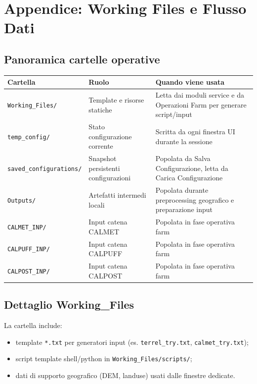 \chapter{Appendice: Working Files e Flusso Dati}

\section{Panoramica cartelle operative}
\begin{longtable}{p{} p{} p{}}
\toprule
\textbf{Cartella} & \textbf{Ruolo} & \textbf{Quando viene usata} \\
\midrule
\endhead
\texttt{Working\_Files/} & Template e risorse statiche & Letta dai moduli service e da Operazioni Farm per generare script/input \\
\texttt{temp\_config/} & Stato configurazione corrente & Scritta da ogni finestra UI durante la sessione \\
\texttt{saved\_configurations/} & Snapshot persistenti configurazioni & Popolata da Salva Configurazione, letta da Carica Configurazione \\
\texttt{Outputs/} & Artefatti intermedi locali & Popolata durante preprocessing geografico e preparazione input \\
\texttt{CALMET\_INP/} & Input catena CALMET & Popolata in fase operativa farm \\
\texttt{CALPUFF\_INP/} & Input catena CALPUFF & Popolata in fase operativa farm \\
\texttt{CALPOST\_INP/} & Input catena CALPOST & Popolata in fase operativa farm \\
\bottomrule
\end{longtable}

\section{Dettaglio Working\_Files}
La cartella include:
\begin{itemize}[leftmargin=1.5em]
  \item template \texttt{*.txt} per generatori input (es. \texttt{terrel\_try.txt}, \texttt{calmet\_try.txt});
  \item script template shell/python in \texttt{Working\_Files/scripts/};
  \item dati di supporto geografico (DEM, landuse) usati dalle finestre dedicate.
\end{itemize}

